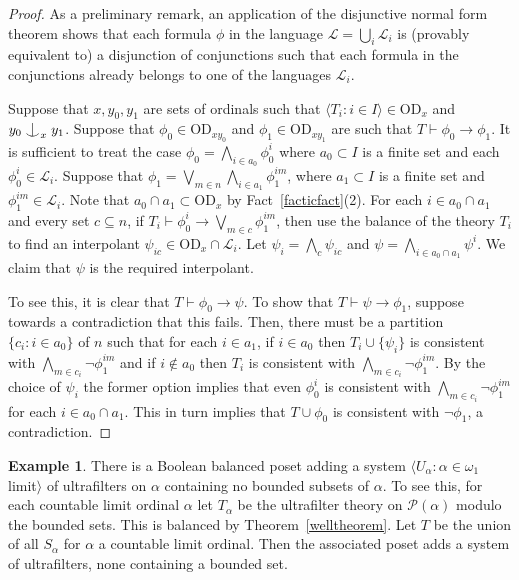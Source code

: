 \documentclass{article}
\newcommand{\ga}{\alpha}
\newcommand{\gw}{\omega}
\newcommand{\forkindep}[1][]{%
  \mathrel{
    \mathop{
      \vcenter{
        \hbox{\oalign{\noalign{\kern-.3ex}\hfil$\vert$\hfil\cr
              \noalign{\kern-.7ex}
              $\smile$\cr\noalign{\kern-.3ex}}}
      }
    }\displaylimits_{#1}
  }
}
\newcommand{\power}{\mathcal{P}}
\newcommand{\vd}{\mathrm{OD}}
\theoremstyle{definition}
\newtheorem{example}[theorem]{Example}
\begin{document}
\begin{proof}
	As a preliminary remark, an application of the disjunctive normal form theorem shows that each formula $\phi$ in the language $\mathcal{L}=\bigcup_i\mathcal{L}_i$ is (provably equivalent to) a disjunction of conjunctions such that each formula in the conjunctions already belongs to one of the languages $\mathcal{L}_i$. 
	
	Suppose that $x, y_0, y_1$ are sets of ordinals such that $\langle T_i\colon i\in I\rangle\in\vd_x$ and $y_0\forkindep_xy_1$. Suppose that $\phi_0\in\vd_{xy_0}$ and $\phi_1\in\vd_{xy_1}$ are such that $T\vdash\phi_0\to\phi_1$. It is sufficient to treat the case $\phi_0=\bigwedge_{i\in a_0}\phi_0^i$ where $a_0\subset I$ is a finite set and each $\phi_0^i\in\mathcal{L}_i$. Suppose that $\phi_1=\bigvee_{m\in n}\bigwedge_{i\in a_1}\phi_1^{im}$, where $a_1\subset I$ is a finite set and $\phi_1^{im}\in\mathcal{L}_i$. Note that $a_0\cap a_1\subset\vd_x$ by Fact~\ref{facticfact}(2). For each $i\in a_0\cap a_1$ and every set $c\subseteq n$, if $T_i\vdash\phi_0^i\to\bigvee_{m\in c}\phi_1^{im}$, then use the balance of the theory $T_i$ to find an interpolant $\psi_{ic}\in\vd_x\cap\mathcal{L}_i$. Let $\psi_i=\bigwedge_c\psi_{ic}$ and $\psi=\bigwedge_{i\in a_0\cap a_1}\psi^i$. We claim that $\psi$ is the required interpolant.
	
	To see this, it is clear that $T\vdash\phi_0\to\psi$. To show that $T\vdash\psi\to\phi_1$, suppose towards a contradiction that this fails. Then, there must be a partition $\{c_i\colon i\in a_0\}$ of $n$ such that for each $i\in a_1$, if $i\in a_0$ then $T_i\cup\{\psi_i\}$ is consistent with $\bigwedge_{m\in c_i}\lnot\phi_1^{im}$ and if $i\notin a_0$ then $T_i$ is consistent with $\bigwedge_{m\in c_i}\lnot\phi_1^{im}$.
	By the choice of $\psi_i$ the former option implies that even $\phi_0^i$ is consistent with $\bigwedge_{m\in c_i}\lnot\phi_1^{im}$ for each $i\in a_0\cap a_1$. This in turn implies that $T\cup\phi_0$ is consistent with $\lnot\phi_1$, a contradiction.
\end{proof}


\begin{example}
There is a Boolean balanced poset adding a system $\langle U_\ga\colon \ga\in\gw_1$ limit$\rangle$ of ultrafilters on $\ga$ containing no bounded subsets of $\ga$. To see this, for each countable limit ordinal $\ga$ let $T_\ga$ be the ultrafilter theory on $\power(\ga)$ modulo the bounded sets. This is balanced by Theorem~\ref{welltheorem}.  Let $T$ be the union of all $S_\ga$ for $\ga$ a countable limit ordinal. Then the associated poset adds a system of ultrafilters, none containing a bounded set.
\end{example}
\end{document}
